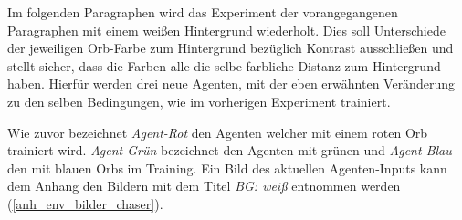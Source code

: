 Im folgenden Paragraphen wird das Experiment der vorangegangenen Paragraphen mit einem weißen Hintergrund wiederholt. Dies soll Unterschiede der jeweiligen Orb-Farbe zum Hintergrund bezüglich Kontrast ausschließen und stellt sicher, dass die Farben alle die selbe farbliche Distanz zum Hintergrund haben. Hierfür werden drei neue Agenten, mit der eben erwähnten Veränderung zu den selben Bedingungen, wie im vorherigen Experiment trainiert. 

Wie zuvor bezeichnet \emph{Agent-Rot} den Agenten welcher mit einem roten Orb trainiert wird. \emph{Agent-Grün} bezeichnet den Agenten mit grünen und \emph{Agent-Blau} den mit blauen Orbs im Training. Ein Bild des aktuellen Agenten-Inputs kann dem Anhang den Bildern mit dem Titel \emph{BG: weiß} entnommen werden (\ref{anh_env_bilder_chaser}).

